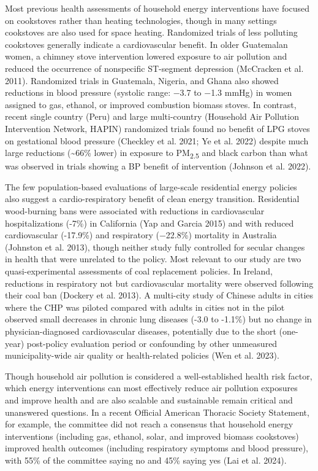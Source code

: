 \documentclass[
  letterpaper,
  DIV=11,
  numbers=noendperiod]{scrartcl}
\begin{document}
Most previous health assessments of household energy interventions have
focused on cookstoves rather than heating technologies, though in many
settings cookstoves are also used for space heating. Randomized trials
of less polluting cookstoves generally indicate a cardiovascular
benefit. In older Guatemalan women, a chimney stove intervention lowered
exposure to air pollution and reduced the occurrence of nonspecific
ST-segment depression (McCracken et al. 2011). Randomized trials in
Guatemala, Nigeria, and Ghana also showed reductions in blood pressure
(systolic range: −3.7 to −1.3 mmHg) in women assigned to gas, ethanol,
or improved combustion biomass stoves. In contrast, recent single
country (Peru) and large multi-country (Household Air Pollution
Intervention Network, HAPIN) randomized trials found no benefit of LPG
stoves on gestational blood pressure (Checkley et al. 2021; Ye et al.
2022) despite much large reductions (\textasciitilde66\% lower) in
exposure to PM\textsubscript{2.5} and black carbon than what was
observed in trials showing a BP benefit of intervention (Johnson et al.
2022).

The few population-based evaluations of large-scale residential energy
policies also suggest a cardio-respiratory benefit of clean energy
transition. Residential wood-burning bans were associated with
reductions in cardiovascular hospitalizations (-7\%) in California (Yap
and Garcia 2015) and with reduced cardiovascular (-17.9\%) and
respiratory (−22.8\%) mortality in Australia (Johnston et al. 2013),
though neither study fully controlled for secular changes in health that
were unrelated to the policy. Most relevant to our study are two
quasi-experimental assessments of coal replacement policies. In Ireland,
reductions in respiratory not but cardiovascular mortality were observed
following their coal ban (Dockery et al. 2013). A multi-city study of
Chinese adults in cities where the CHP was piloted compared with adults
in cities not in the pilot observed small decreases in chronic lung
diseases (-3.0 to -1.1\%) but no change in physician-diagnosed
cardiovascular diseases, potentially due to the short (one-year)
post-policy evaluation period or confounding by other unmeasured
municipality-wide air quality or health-related policies (Wen et al.
2023).

Though household air pollution is considered a well-established health
risk factor, which energy interventions can most effectively reduce air
pollution exposures and improve health and are also scalable and
sustainable remain critical and unanswered questions. In a recent
Official American Thoracic Society Statement, for example, the committee
did not reach a consensus that household energy interventions (including
gas, ethanol, solar, and improved biomass cookstoves) improved health
outcomes (including respiratory symptoms and blood pressure), with 55\%
of the committee saying no and 45\% saying yes (Lai et al. 2024).
\end{document}
